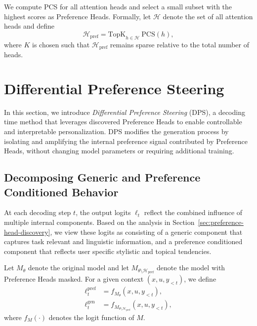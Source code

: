 \documentclass[11pt]{article}
\begin{document}
We compute PCS for all attention heads and select a small subset with the highest scores as Preference Heads.
Formally, let $\mathcal{H}$ denote the set of all attention heads and define
\begin{equation}
\mathcal{H}_{\mathrm{pref}} =
\mathrm{TopK}_{h \in \mathcal{H}} \ \mathrm{PCS}(h),
\end{equation}
where $K$ is chosen such that $\mathcal{H}_{\mathrm{pref}}$ remains sparse relative to the total number of heads.






\section{Differential Preference Steering}
\label{sec:dps}

In this section, we introduce \emph{Differential Preference Steering} (DPS), a decoding time method that leverages discovered Preference Heads to enable controllable and interpretable personalization.
DPS modifies the generation process by isolating and amplifying the internal preference signal contributed by Preference Heads, without changing model parameters or requiring additional training.

\subsection{Decomposing Generic and Preference Conditioned Behavior}

At each decoding step $t$, the output logits $\ell_t$ reflect the combined influence of multiple internal components.
Based on the analysis in Section~\ref{sec:preference-head-discovery}, we view these logits as consisting of a generic component that captures task relevant and linguistic information, and a preference conditioned component that reflects user specific stylistic and topical tendencies.

Let $M_\theta$ denote the original model and let $M_{\theta \setminus \mathcal{H}_{\mathrm{pref}}}$ denote the model with Preference Heads masked.
For a given context $(x, u, y_{<t})$, we define
\begin{align}
\ell_t^{\mathrm{pref}} &= f_{M_\theta}(x, u, y_{<t}), \\
\ell_t^{\mathrm{gen}} &= f_{M_{\theta \setminus \mathcal{H}_{\mathrm{pref}}}}(x, u, y_{<t}),
\end{align}
where $f_M(\cdot)$ denotes the logit function of $M$.
\end{document}
